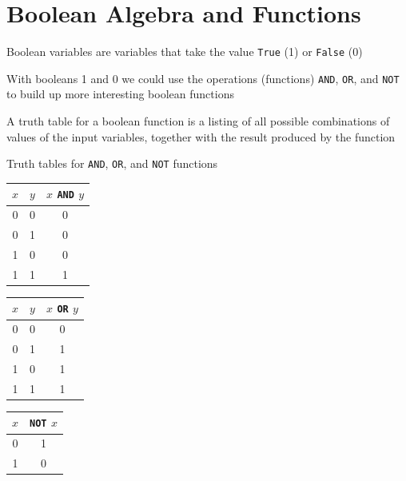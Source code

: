 \documentclass[8pt,a4paper,compress]{beamer}
\begin{document}
\section{Boolean Algebra and Functions}
\begin{frame}[fragile]
\pause

Boolean variables are variables that take the value \lstinline{True} (1) or \lstinline{False} (0)

\pause
\bigskip

With booleans 1 and 0 we could use the operations (functions) \lstinline{AND}, \lstinline{OR}, and \lstinline{NOT} to build up more interesting boolean functions

\pause
\bigskip

A truth table for a boolean function is a listing of all possible combinations of values of the input variables, together with the result produced by the function

\pause
\bigskip

Truth tables for \lstinline{AND}, \lstinline{OR}, and \lstinline{NOT} functions

\begin{center}
\begin{tabular}{cc|c}
$x$ & $y$ & $x$ \lstinline$AND$ $y$ \\ \hline
0 & 0 & 0 \\
0 & 1 & 0 \\
1 & 0 & 0 \\
1 & 1 & 1
\end{tabular}\hspace{1cm} \begin{tabular}{cc|c}
$x$ & $y$ & $x$ \lstinline$OR$ $y$ \\ \hline
0 & 0 & 0 \\
0 & 1 & 1 \\
1 & 0 & 1 \\
1 & 1 & 1
\end{tabular}\hspace{1cm} \begin{tabular}{c|c}
$x$ & \lstinline$NOT$ $x$ \\ \hline
0 & 1 \\
1 & 0
\end{tabular}
\end{center}
\end{frame}
\end{document}
